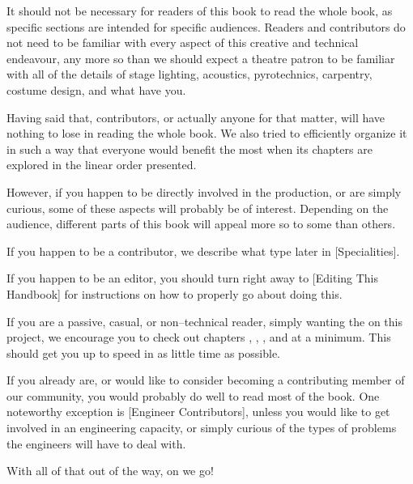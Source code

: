 

It should not be necessary for readers of this book to read the whole book, as specific sections are intended for specific audiences. Readers and contributors do not need to be familiar with every aspect of this creative and technical endeavour, any more so than we should expect a theatre patron to be familiar with all of the details of stage lighting, acoustics, pyrotechnics, carpentry, costume design, and what have you.

Having said that, contributors, or actually anyone for that matter, will have nothing to lose in reading the whole book. We also tried to efficiently organize it in such a way that everyone would benefit the most when its chapters are explored in the linear order presented.

However, if you happen to be directly involved in the production, or are simply curious, some of these aspects will probably be of interest. Depending on the audience, different parts of this book will appeal more so to some than others.

If you happen to be a contributor, we describe what type later in [Specialities].

If you happen to be an editor, you should turn right away to [Editing This Handbook] for instructions on how to properly go about doing this.

If you are a passive, casual, or non--technical reader, simply wanting the  on this project, we encourage you to check out chapters \in[Leitmotifs], , , and \in[Timeline] at a minimum. This should get you up to speed in as little time as possible.

If you already are, or would like to consider becoming a contributing member of our community, you would probably do well to read most of the book. One noteworthy exception is [Engineer Contributors], unless you would like to get involved in an engineering capacity, or simply curious of the types of problems the engineers will have to deal with.

With all of that out of the way, on we go!

\StopChapter

